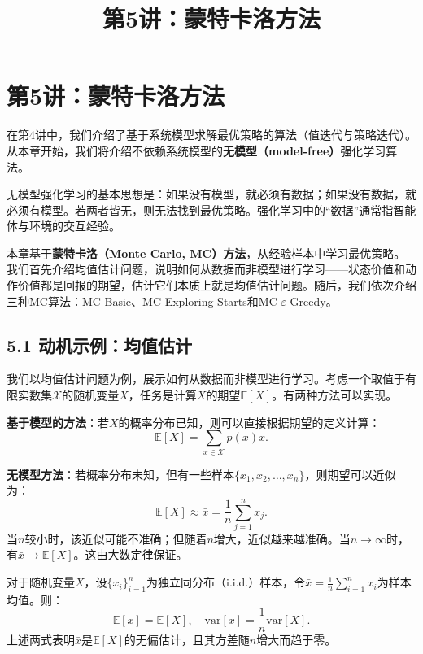 \documentclass[UTF8]{article}
\title{第5讲：蒙特卡洛方法}
\author{}
\date{}
\begin{document}
\maketitle
\thispagestyle{empty}

\section*{第5讲：蒙特卡洛方法}

在第4讲中，我们介绍了基于系统模型求解最优策略的算法（值迭代与策略迭代）。从本章开始，我们将介绍不依赖系统模型的\textbf{无模型（model-free）}强化学习算法。

无模型强化学习的基本思想是：如果没有模型，就必须有数据；如果没有数据，就必须有模型。若两者皆无，则无法找到最优策略。强化学习中的“数据”通常指智能体与环境的交互经验。

本章基于\textbf{蒙特卡洛（Monte Carlo, MC）方法}，从经验样本中学习最优策略。我们首先介绍均值估计问题，说明如何从数据而非模型进行学习——状态价值和动作价值都是回报的期望，估计它们本质上就是均值估计问题。随后，我们依次介绍三种MC算法：MC Basic、MC Exploring Starts和MC $\varepsilon$-Greedy。

\subsection*{5.1 动机示例：均值估计}

我们以均值估计问题为例，展示如何从数据而非模型进行学习。考虑一个取值于有限实数集$\mathcal{X}$的随机变量$X$，任务是计算$X$的期望$\mathbb{E}[X]$。有两种方法可以实现。

\textbf{基于模型的方法}：若$X$的概率分布已知，则可以直接根据期望的定义计算：
\[
\mathbb{E}[X] = \sum_{x \in \mathcal{X}} p(x) x .
\]

\textbf{无模型方法}：若概率分布未知，但有一些样本$\{x_1, x_2, \ldots, x_n\}$，则期望可以近似为：
\[
\mathbb{E}[X] \approx \bar{x} = \frac{1}{n} \sum_{j=1}^{n} x_j .
\]
当$n$较小时，该近似可能不准确；但随着$n$增大，近似越来越准确。当$n \to \infty$时，有$\bar{x} \to \mathbb{E}[X]$。这由大数定律保证。

\begin{theorembox}[5.1 大数定律]
    对于随机变量$X$，设$\{x_i\}_{i=1}^n$为独立同分布（i.i.d.）样本，令$\bar{x} = \frac{1}{n}\sum_{i=1}^n x_i$为样本均值。则：
    \[
    \mathbb{E}[\bar{x}] = \mathbb{E}[X], \quad \mathrm{var}[\bar{x}] = \frac{1}{n} \mathrm{var}[X] .
    \]
    上述两式表明$\bar{x}$是$\mathbb{E}[X]$的无偏估计，且其方差随$n$增大而趋于零。
\end{theorembox}
\end{document}
